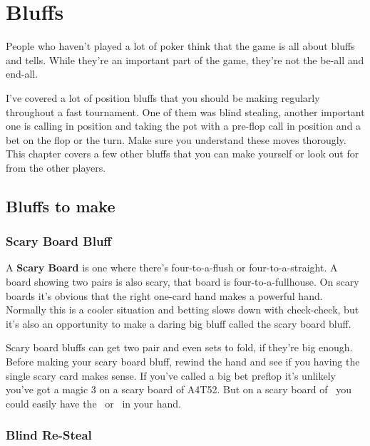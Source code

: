 \chapter{Bluffs}


People who haven't played a lot of poker think that the game
is all about bluffs and tells. While they're an important
part of the game, they're not the be-all and end-all.

I've covered a lot of position bluffs that you should be making
regularly throughout a fast tournament. One of them was
blind stealing, another important one is calling in position and
taking the pot with a pre-flop call in position and a bet on the flop
or the turn. Make sure you understand these moves thorougly. This
chapter covers a few other bluffs that you can make yourself or look
out for from the other players.

\section{Bluffs to make}

\subsection{Scary Board Bluff}

A \textbf{Scary Board} is one where there's four-to-a-flush or
four-to-a-straight. A board showing two pairs is also scary, that
board is four-to-a-fullhouse.  On scary boards it's obvious that the
right one-card hand makes a powerful hand. Normally this is a
cooler situation and betting slows down with check-check, but it's
also an opportunity to make a daring big bluff called the scary board
bluff.

Scary board bluffs can get two pair and even sets to fold, if they're
big enough. Before making your scary board bluff, rewind the hand and
see if you having the single scary card makes sense. If you've called
a big bet preflop it's unlikely you've got a magic 3 on a scary board
of A4T52. But on a scary board of \Ad\nined\sixs\fourd\tred\ you could
easily have the \Kd\ or \Qd\ in your hand.

\subsection{Blind Re-Steal}

